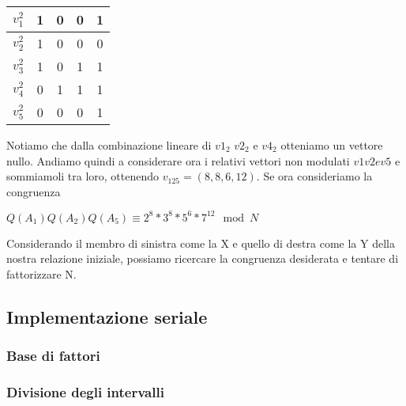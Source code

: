 \begin{flushleft}
\begin{center}
\vspace{1cm} 

\begin{tabular}{|l|c|c|c|c|}
\hline
$v_1^2$ & 1 & 0 & 0 & 1\\
\hline
$v_2^2$ & 1 & 0 & 0 & 0\\
\hline
$v_3^2$ & 1 & 0 & 1 & 1\\
\hline
$v_4^2$ & 0 & 1 & 1 & 1\\
\hline
$v_5^2$ & 0 & 0 & 0 & 1\\
\hline
\end{tabular}

\end{center}

Notiamo che dalla combinazione lineare di $v1_2$ $v2_2$ e $v4_2$ otteniamo un vettore nullo.
Andiamo quindi a considerare ora i relativi vettori non modulati $ v1 v2 e v5$ e sommiamoli tra
loro, ottenendo $v_125=(8,8,6,12)$.
Se ora consideriamo la congruenza 
\begin{center}
   $Q(A_1)Q(A_2)Q(A_5) \equiv 2^8*3^8*5^6*7^12 \mod N$
\end{center}
Considerando il membro di sinistra come la X e quello di destra come la Y della nostra relazione iniziale, possiamo ricercare la congruenza desiderata e tentare di fattorizzare N.


\subsection*{Implementazione seriale}
\subsubsection*{Base di fattori}
\subsubsection*{Divisione degli intervalli}


\end{flushleft}





